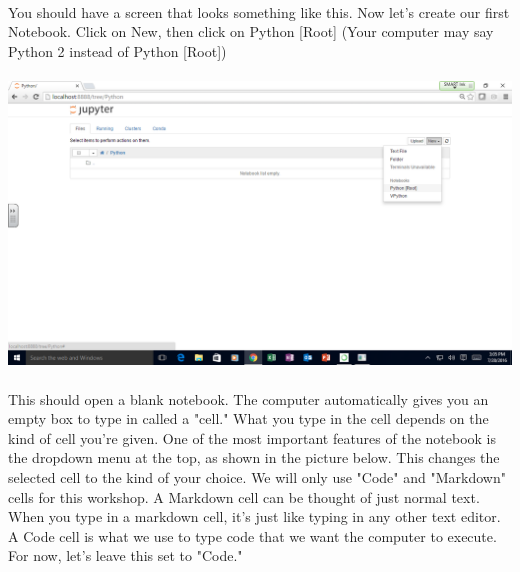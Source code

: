 \documentclass[]{article}
\begin{document}
\paragraph{}
You should have a screen that looks something like this. Now let's create our first Notebook. Click on New, then click on Python [Root] (Your computer may say Python 2 instead of Python [Root])
\paragraph{}
\begin{centering}
    \centerline{\includegraphics[scale=0.35]{Screenshot_20.png}}
\end{centering}

\paragraph{}
This should open a blank notebook. The computer automatically gives you an empty box to type in called a "cell." What you type in the cell depends on the kind of cell you're given. One of the most important features of the notebook is the dropdown menu at the top, as shown in the picture below. This changes the selected cell to the kind of your choice. We will only use "Code" and "Markdown" cells for this workshop. A Markdown cell can be thought of just normal text. When you type in a markdown cell, it's just like typing in any other text editor. A Code cell is what we use to type code that we want the computer to execute. For now, let's leave this set to "Code."
\end{document}
